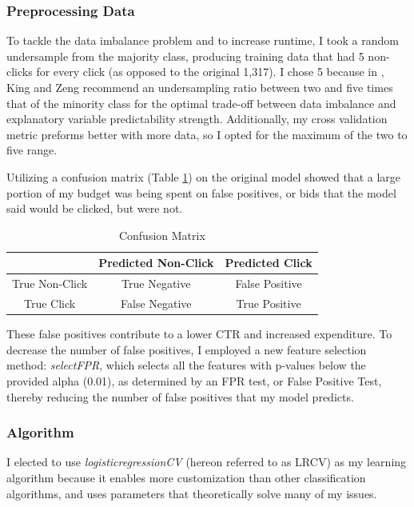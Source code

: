 \documentclass{sig-alternate-05-2015}
\begin{document}
\subsubsection{Preprocessing Data}
To tackle the data imbalance problem and to increase runtime, I took a random undersample from the majority class, producing training data that had 5 non-clicks for every click (as opposed to the original 1,317).  I chose 5 because in \cite{zeroMult}, King and Zeng recommend an undersampling ratio between two and five times that of the minority class for the optimal trade-off between data imbalance and explanatory variable predictability strength. Additionally, my cross validation metric preforms better with more data, so I opted for the maximum of the two to five range.

Utilizing a confusion matrix (Table \ref{confusionMatrix}) on the original model showed that a large portion of my budget was being spent on false positives, or bids that the model said would be clicked, but were not.

\begin{table}[h!]
\centering
\begin{tabular}{ | c | c | c |}
 \hline
 & Predicted Non-Click & Predicted Click \\
 \hline
 True Non-Click & True Negative & False Positive \\
 \hline
 True Click & False Negative & True Positive \\
 \hline
\end{tabular}
\caption{Confusion Matrix}
\label{confusionMatrix}
\end{table}

These false positives contribute to a lower CTR and increased expenditure.  To decrease the number of false positives, I employed a new feature selection method: \textit{selectFPR}, which selects all the features with p-values below the provided alpha (0.01), as determined by an FPR test, or False Positive Test, thereby reducing the number of false positives that my model predicts.

\subsubsection{Algorithm}
I elected to use \textit{logisticregressionCV} (hereon referred to as LRCV) as my learning algorithm because it enables more customization than other classification algorithms, and uses parameters that theoretically solve many of my issues.
\end{document}
